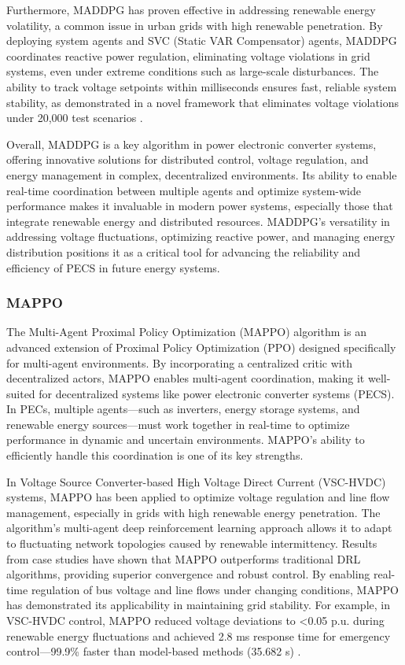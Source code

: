 Furthermore, MADDPG has proven effective in addressing renewable energy volatility, a common issue in urban grids with high renewable penetration. By deploying system agents and SVC (Static VAR Compensator) agents, MADDPG coordinates reactive power regulation, eliminating voltage violations in grid systems, even under extreme conditions such as large-scale disturbances. The ability to track voltage setpoints within milliseconds ensures fast, reliable system stability, as demonstrated in a novel framework that eliminates voltage violations under 20,000 test scenarios \cite{zhang2021ddpg}.

Overall, MADDPG is a key algorithm in power electronic converter systems, offering innovative solutions for distributed control, voltage regulation, and energy management in complex, decentralized environments. Its ability to enable real-time coordination between multiple agents and optimize system-wide performance makes it invaluable in modern power systems, especially those that integrate renewable energy and distributed resources. MADDPG's versatility in addressing voltage fluctuations, optimizing reactive power, and managing energy distribution positions it as a critical tool for advancing the reliability and efficiency of PECS in future energy systems.

\subsubsection{MAPPO}

The Multi-Agent Proximal Policy Optimization (MAPPO) algorithm is an advanced extension of Proximal Policy Optimization (PPO) designed specifically for multi-agent environments. By incorporating a centralized critic with decentralized actors, MAPPO enables multi-agent coordination, making it well-suited for decentralized systems like power electronic converter systems (PECS). In PECs, multiple agents—such as inverters, energy storage systems, and renewable energy sources—must work together in real-time to optimize performance in dynamic and uncertain environments. MAPPO’s ability to efficiently handle this coordination is one of its key strengths.

In Voltage Source Converter-based High Voltage Direct Current (VSC-HVDC) systems, MAPPO has been applied to optimize voltage regulation and line flow management, especially in grids with high renewable energy penetration. The algorithm’s multi-agent deep reinforcement learning approach allows it to adapt to fluctuating network topologies caused by renewable intermittency. Results from case studies have shown that MAPPO outperforms traditional DRL algorithms, providing superior convergence and robust control. By enabling real-time regulation of bus voltage and line flows under changing conditions, MAPPO has demonstrated its applicability in maintaining grid stability. For example, in VSC-HVDC control, MAPPO reduced voltage deviations to <0.05 p.u. during renewable energy fluctuations and achieved 2.8 ms response time for emergency control—99.9\% faster than model-based methods (35.682 s) \cite {song2023proximal}.

